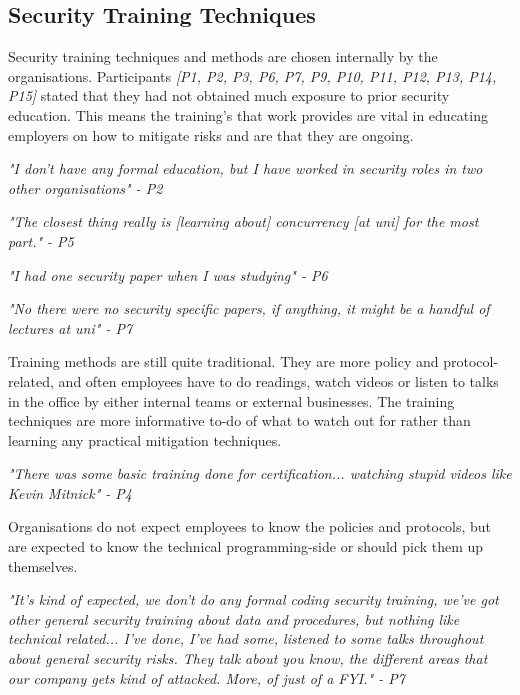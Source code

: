 \subsection{Security Training Techniques}
\par 
Security training techniques and methods are chosen internally by the organisations. Participants \textit{[P1, P2, P3, P6, P7, P9, P10, P11, P12, P13, P14, P15]} stated that they had not obtained much exposure to prior security education. This means the training's that work provides are vital in educating employers on how to mitigate risks and are that they are ongoing. 
\newline
\par 
\textit{"I don't have any formal education, but I have worked in security roles in two other organisations" - P2}
\newline
\par
\textit{"The closest thing really is [learning about] concurrency [at uni] for the most part." - P5}
\newline
\par
\textit{"I had one security paper when I was studying" - P6}
\newline
\par
\textit{"No there were no security specific papers, if anything, it might be a handful of lectures at uni" - P7}
\newline
\par
Training methods are still quite traditional. They are more policy and protocol-related, and often employees have to do readings, watch videos or listen to talks in the office by either internal teams or external businesses. The training techniques are more informative to-do of what to watch out for rather than learning any practical mitigation techniques. 
\newline
\par
\textit{"There was some basic training done for certification... watching stupid videos like Kevin Mitnick" - P4}
\newline
\par 
Organisations do not expect employees to know the policies and protocols, but are expected to know the technical programming-side or should pick them up themselves.
\newline
\par 
\textit{"It's kind of expected, we don't do any formal coding security training, we've got other general security training about data and procedures, but nothing like technical related... I've done, I've had some, listened to some talks throughout about general security risks. They talk about you know, the different areas that our company gets kind of attacked. More, of just of a FYI." - P7}
